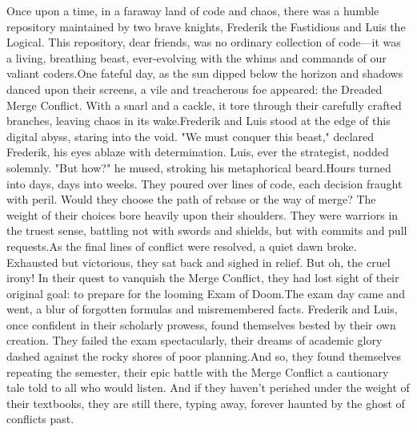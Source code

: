 {}{
    Once upon a time, in a faraway land of code and chaos, there was a humble repository maintained by two brave knights, Frederik the Fastidious and Luis the Logical. This repository, dear friends, was no ordinary collection of code—it was a living, breathing beast, ever-evolving with the whims and commands of our valiant coders.One fateful day, as the sun dipped below the horizon and shadows danced upon their screens, a vile and treacherous foe appeared: the Dreaded Merge Conflict. With a snarl and a cackle, it tore through their carefully crafted branches, leaving chaos in its wake.Frederik and Luis stood at the edge of this digital abyss, staring into the void. "We must conquer this beast," declared Frederik, his eyes ablaze with determination. Luis, ever the strategist, nodded solemnly. "But how?" he mused, stroking his metaphorical beard.Hours turned into days, days into weeks. They poured over lines of code, each decision fraught with peril. Would they choose the path of rebase or the way of merge? The weight of their choices bore heavily upon their shoulders. They were warriors in the truest sense, battling not with swords and shields, but with commits and pull requests.As the final lines of conflict were resolved, a quiet dawn broke. Exhausted but victorious, they sat back and sighed in relief. But oh, the cruel irony! In their quest to vanquish the Merge Conflict, they had lost sight of their original goal: to prepare for the looming Exam of Doom.The exam day came and went, a blur of forgotten formulas and misremembered facts. Frederik and Luis, once confident in their scholarly prowess, found themselves bested by their own creation. They failed the exam spectacularly, their dreams of academic glory dashed against the rocky shores of poor planning.And so, they found themselves repeating the semester, their epic battle with the Merge Conflict a cautionary tale told to all who would listen. And if they haven't perished under the weight of their textbooks, they are still there, typing away, forever haunted by the ghost of conflicts past.
}